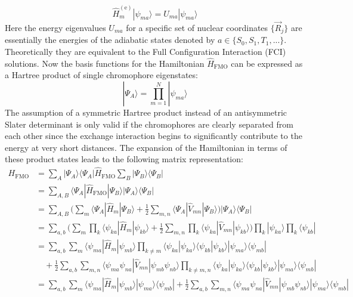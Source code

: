 \documentclass[9pt]{report}
\begin{document}
\begin{equation}
\hat{H}_{m}^{\mathrm{(e)}}|\psi_{ma}\rangle = U_{ma}|\psi_{ma}\rangle
\end{equation}
Here the energy eigenvalues $U_{ma}$ for a specific set of nuclear coordinates $\{\vec{R}_j\}$ are essentially the energies of the adiabatic states denoted by $a\in \{S_0, S_1, T_1,...\}$. Theoretically they are equivalent to the Full Configuration Interaction (FCI) solutions. Now the basis functions for the Hamiltonian $\hat{H}_{\mathrm{FMO}}$ can be expressed as a Hartree product of single chromophore eigenstates:
\begin{equation}
|\Psi_A\rangle = \prod_{m=1}^{N}|\psi_{ma}\rangle
\end{equation}
The assumption of a symmetric Hartree product instead of an antisymmetric Slater determinant is only valid if the chromophores are clearly separated from each other since the exchange interaction begins to significantly contribute to the energy at very short distances. The expansion of the Hamiltonian in terms of these product states leads to the following matrix representation:
\begin{align}
H_{\mathrm{FMO}} &= \sum_{A}|\Psi_{A}\rangle\langle\Psi_{A}|\hat{H}_{\mathrm{FMO}}\sum_{B}|\Psi_{B}\rangle\langle\Psi_{B}|\\
&= \sum_{A,B}\langle\Psi_{A}|\hat{H}_{\mathrm{FMO}}|\Psi_{B}\rangle|\Psi_{A}\rangle\langle\Psi_{B}|\\
&= \sum_{A,B}\Big(\sum_{m}\langle\Psi_{A}|\hat{H}_{m}|\Psi_{B}\rangle +\frac{1}{2}\sum_{m,n}\langle\Psi_{A}|\hat{V}_{mn}|\Psi_{B}\rangle\Big)|\Psi_{A}\rangle\langle\Psi_{B}|\\
&= \sum_{a,b}\Big(\sum_{m}\prod_{k}\langle\psi_{ka}|\hat{H}_{m}|\psi_{kb}\rangle +\frac{1}{2}\sum_{m,n}\prod_{k}\langle\psi_{ka}|\hat{V}_{mn}|\psi_{kb}\rangle\Big)\prod_{k}|\psi_{ka}\rangle\prod_{k}\langle\psi_{kb}|\\
&= \sum_{a,b}\sum_{m}\langle\psi_{ma}|\hat{H}_{m}|\psi_{mb}\rangle\prod_{k\neq m}\langle\psi_{ka}|\psi_{ka}\rangle\langle\psi_{kb}|\psi_{kb}\rangle|\psi_{ma}\rangle\langle\psi_{mb}|\\
&\quad + \frac{1}{2}\sum_{a,b}\sum_{m,n}\langle\psi_{ma}\psi_{na}|\hat{V}_{mn}|\psi_{mb}\psi_{nb}\rangle\prod_{k\neq m,n}\langle\psi_{ka}|\psi_{ka}\rangle\langle\psi_{kb}|\psi_{kb}\rangle|\psi_{ma}\rangle\langle\psi_{mb}|\\
&= \sum_{a,b}\sum_{m}\langle\psi_{ma}|\hat{H}_{m}|\psi_{mb}\rangle|\psi_{ma}\rangle\langle\psi_{mb}| + \frac{1}{2}\sum_{a,b}\sum_{m,n}\langle\psi_{ma}\psi_{na}|\hat{V}_{mn}|\psi_{mb}\psi_{nb}\rangle|\psi_{ma}\rangle\langle\psi_{mb}|
\end{align}
\end{document}
